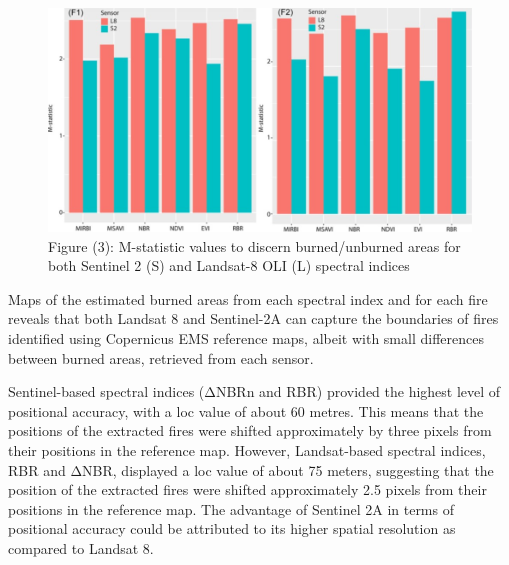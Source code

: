 \documentclass[
  letterpaper,
  DIV=11,
  numbers=noendperiod]{scrreprt}
\begin{document}
\begin{figure}

{\centering \includegraphics[width=5.20833in,height=\textheight]{application2.jpg}

}

\caption{Figure (3): M-statistic values to discern burned/unburned areas
for both Sentinel 2 (S) and Landsat-8 OLI (L) spectral indices}

\end{figure}

Maps of the estimated burned areas from each spectral index and for each
fire reveals that both Landsat 8 and Sentinel-2A can capture the
boundaries of fires identified using Copernicus EMS reference maps,
albeit with small differences between burned areas, retrieved from each
sensor.

Sentinel-based spectral indices (ΔNBRn and RBR) provided the highest
level of positional accuracy, with a loc value of about 60 metres. This
means that the positions of the extracted fires were shifted
approximately by three pixels from their positions in the reference map.
However, Landsat-based spectral indices, RBR and ΔNBR, displayed a loc
value of about 75 meters, suggesting that the position of the extracted
fires were shifted approximately 2.5 pixels from their positions in the
reference map. The advantage of Sentinel 2A in terms of positional
accuracy could be attributed to its higher spatial resolution as
compared to Landsat 8.
\end{document}

